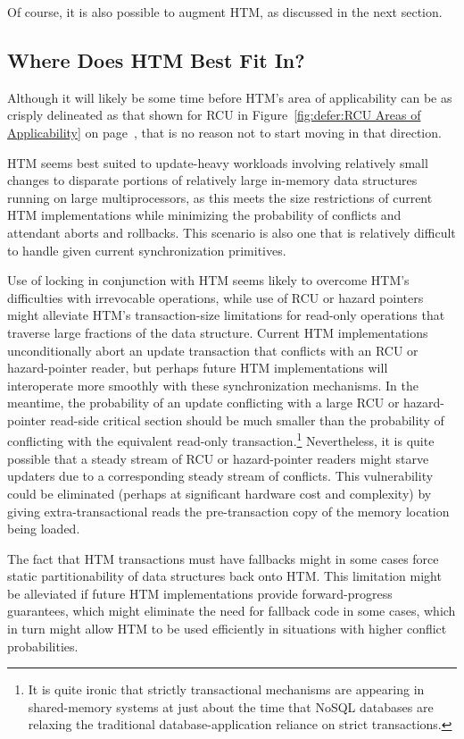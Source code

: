 Of course, it is also possible to augment HTM,
as discussed in the next section.

\subsection{Where Does HTM Best Fit In?}
\label{sec:future:Where Does HTM Best Fit In?}

Although it will likely be some time before HTM's area of applicability
can be as crisply delineated as that shown for RCU in
Figure~\ref{fig:defer:RCU Areas of Applicability} on
page~\pageref{fig:defer:RCU Areas of Applicability}, that is no reason not to
start moving in that direction.

HTM seems best suited to update-heavy workloads involving relatively
small changes to disparate portions of relatively large in-memory
data structures running on large multiprocessors,
as this meets the size restrictions of current HTM implementations while
minimizing the probability of conflicts and attendant aborts and
rollbacks.
This scenario is also one that is relatively difficult to handle given
current synchronization primitives.

Use of locking in conjunction with HTM seems likely to overcome HTM's
difficulties with irrevocable operations, while use of RCU or
hazard pointers might alleviate HTM's transaction-size limitations
for read-only operations that traverse large fractions of the data
structure.
Current HTM implementations unconditionally abort an update transaction
that conflicts with an RCU or hazard-pointer reader, but perhaps future
HTM implementations will interoperate more smoothly with these
synchronization mechanisms.
In the meantime, the probability of an update conflicting with a
large RCU or hazard-pointer read-side critical section should be
much smaller than the probability of conflicting with the equivalent
read-only transaction.\footnote{
	It is quite ironic that strictly transactional mechanisms are
	appearing in shared-memory systems at just about the time
	that NoSQL databases are relaxing the traditional
	database-application reliance on strict transactions.}
Nevertheless, it is quite possible that a steady stream of RCU or
hazard-pointer readers might starve updaters due to a corresponding
steady stream of conflicts.
This vulnerability could be eliminated (perhaps at significant
hardware cost and complexity) by giving extra-transactional
reads the pre-transaction copy of the memory location being loaded.

The fact that HTM transactions must have fallbacks might in some cases
force static partitionability of data structures back onto HTM.
This limitation might be alleviated if future HTM implementations
provide forward-progress guarantees, which might eliminate the need
for fallback code in some cases, which in turn might allow HTM to
be used efficiently in situations with higher conflict probabilities.

